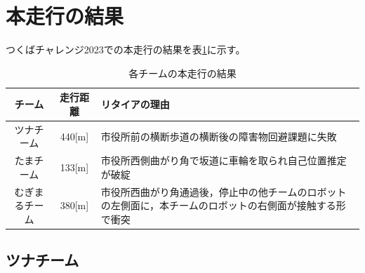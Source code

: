\documentclass[twocolumn,9pt]{jsproceedings}
\begin{document}


\section{本走行の結果}

つくばチャレンジ2023での本走行の結果を表\ref{MainRun}に示す。

\begin{table}[H]
  \caption{各チームの本走行の結果}
  \label{MainRun}
  \begin{tabular}{|c|c|p{4.0cm}|}
    \hline
    チーム         & 走行距離 & リタイアの理由                                                                                             \\
    \hline
    ツナチーム     & 440[m]   & 市役所前の横断歩道の横断後の障害物回避課題に失敗                                                           \\
    \hline
    たまチーム     & 133[m]   & 市役所西側曲がり角で坂道に車輪を取られ自己位置推定が破綻                                                   \\
    \hline
    むぎまるチーム & 380[m]    & 市役所西曲がり角通過後，停止中の他チームのロボットの左側面に，本チームのロボットの右側面が接触する形で衝突 \\
    \hline
  \end{tabular}
\end{table}



\subsection{ツナチーム}
\end{document}
